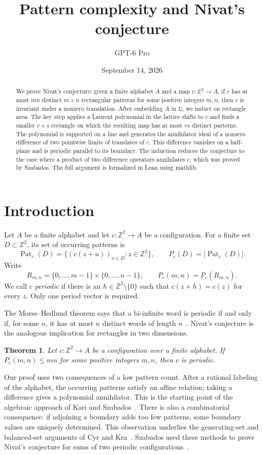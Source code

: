 \documentclass[11pt,a4paper,reqno]{amsart}
\title[Pattern complexity and Nivat's conjecture]{Pattern complexity and Nivat's conjecture}
\author{GPT-6 Pro}
\date{September 14, 2026}
\newtheorem{theorem}{Theorem}[section]
\theoremstyle{remark}
\newcommand{\Z}{\mathbb Z}
\newcommand{\Q}{\mathbb Q}
\DeclareMathOperator{\Pat}{Pat}
\numberwithin{equation}{section}
\begin{document}
\begin{abstract}
We prove Nivat's conjecture: given a finite alphabet $A$ and a map $c:\Z^2\to A$, if $c$ has at most $mn$ distinct $m\times n$ rectangular patterns for some positive integers $m,n$, then $c$ is invariant under a nonzero translation. After embedding $A$ in $\Q$, we induct on rectangle area. The key step applies a Laurent polynomial in the lattice shifts to $c$ and finds a smaller $r\times s$ rectangle on which the resulting map has at most $rs$ distinct patterns. The polynomial is supported on a line and generates the annihilator ideal of a nonzero difference of two pointwise limits of translates of $c$. This difference vanishes on a half-plane and is periodic parallel to its boundary. The induction reduces the conjecture to the case where a product of two difference operators annihilates $c$, which was proved by Szabados. The full argument is formalized in Lean using mathlib.
\end{abstract}
\maketitle

\section{Introduction}\label{sec:intro}
Let $A$ be a finite alphabet and let $c:\Z^2\to A$ be a configuration. For a finite set $D\subset\Z^2$, its set of occurring patterns is
\[
 \Pat_c(D)=\{(c(z+u))_{u\in D}:z\in\Z^2\},
 \qquad P_c(D)=|\Pat_c(D)|.
\]
Write
\[
 R_{m,n}=\{0,\ldots,m-1\}\times\{0,\ldots,n-1\},
 \qquad P_c(m,n)=P_c(R_{m,n}).
\]
We call $c$ \emph{periodic} if there is an $h\in\Z^2\setminus\{0\}$ such that $c(z+h)=c(z)$ for every $z$. Only one period vector is required.

The Morse--Hedlund theorem says that a bi-infinite word is periodic if and only if, for some $n$, it has at most $n$ distinct words of length $n$~\cite{MH}. Nivat's conjecture is the analogous implication for rectangles in two dimensions.

\begin{theorem}\label{thm:main}
Let $c:\Z^2\to A$ be a configuration over a finite alphabet. If $P_c(m,n)\le mn$ for some positive integers $m,n$, then $c$ is periodic.
\end{theorem}

Our proof uses two consequences of a low pattern count. After a rational labeling of the alphabet, the occurring patterns satisfy an affine relation; taking a difference gives a polynomial annihilator. This is the starting point of the algebraic approach of Kari and Szabados~\cite{KS}. There is also a combinatorial consequence: if adjoining a boundary adds too few patterns, some boundary values are uniquely determined. This observation underlies the generating-set and balanced-set arguments of Cyr and Kra~\cite{CK}. Szabados used these methods to prove Nivat's conjecture for sums of two periodic configurations~\cite{Sz}.
\end{document}
